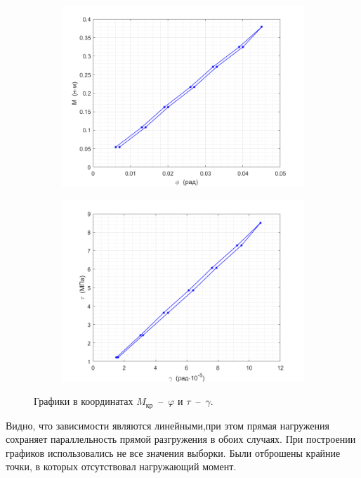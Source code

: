 \documentclass[12pt, a4paper]{article}
\begin{document}
    \begin{figure}[h]
        \centering
        \begin{subfigure}{\textwidth}
            \centering
            \includegraphics[width = 12cm]{figure_1.png}
        \end{subfigure}
        \begin{subfigure}{\textwidth}
            \centering
            \includegraphics[width = 12cm]{figure_2.png}
        \end{subfigure}
        \caption{Графики в координатах $M_{\text{кр}}$~--~$\varphi$ и $\tau$~--~$\gamma$.}
        \label{fig1}
    \end{figure}
    
    Видно, что зависимости являются линейными,при этом прямая нагружения сохраняет параллельность прямой разгружения в обоих случаях. При построении графиков использовались не все значения выборки. Были отброшены крайние точки, в которых отсутствовал нагружающий момент.
    
\end{document}
